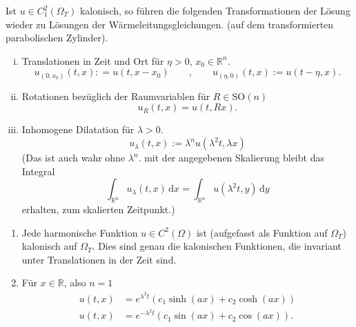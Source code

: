 \begin{bemerkung}
	Ist $u \in C_1^2(\Omega_T)$ kalonisch, so führen die folgenden Transformationen der Lösung wieder zu Lösungen der Wärmeleitungsgleichungen. 
	(auf dem transformierten parabolischen Zylinder). 
	\begin{enumerate}[(i)]
		\item Translationen in Zeit und Ort für $\eta >0$, $x_0 \in \mathbb{R}^n$.
		\[
			u_{(0,x_0)}(t,x): = u(t,x-x_0) \qquad , \qquad u_{(\eta,0)}(t,x) := u(t-\eta,x).
		\]
		\item Rotationen bezüglich der Raumvariablen für $R \in \text{SO}(n)$
		\[
			u_R(t,x) = u(t,Rx).
		\]
		\item Inhomogene Dilatation für $\lambda >0$.
		\[
			u_{\lambda}(t,x) := \lambda^n u ( \lambda^2 t, \lambda x)
		\]
		(Das ist auch wahr ohne $\lambda^n$. mit der angegebenen Skalierung bleibt das Integral
		\[
			\int_{\mathbb{R}^n}^{} u _{\lambda}(t,x) \,\mathrm{d}x = \int_{\mathbb{R}^n}^{} u(\lambda^2t,y) \,\mathrm{d}y
		\] erhalten, zum skalierten Zeitpunkt.)
	\end{enumerate}
\end{bemerkung}

\begin{beispiele}
	\begin{enumerate}[1)]
		\item Jede harmonische Funktion $u \in C^2(\Omega)$ ist (aufgefasst als Funktion auf $\Omega_T$) kalonisch auf $\Omega_T$. 
		Dies sind genau die kalonischen Funktionen, die invariant unter Translationen in der Zeit sind.
		\item Für $x \in \mathbb{R}$, also $n=1$
		\begin{align*}
			u(t,x) &= e^{\lambda^2t} ( c_1 \sinh(ax) + c_2 \cosh(ax)) \\
			u(t,x) &= e^{- \lambda^2t}(c_1 \sin(ax)+ c_2 \cos(ax)).
		\end{align*}
	\end{enumerate}
\end{beispiele}
